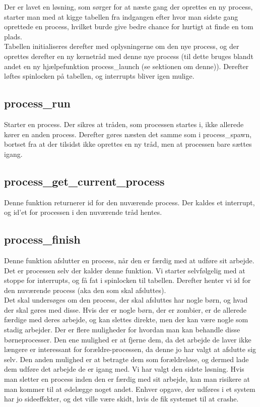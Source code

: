\documentclass[10pt,a4paper,danish]{article}
\begin{document}
Der er lavet en løsning, som sørger for at næste gang der oprettes en ny process, starter man med at kigge tabellen fra indgangen efter hvor man sidste gang oprettede en process, hvilket burde give bedre chance for hurtigt at finde en tom plads.\\

Tabellen initialiseres derefter med oplysningerne om den nye process, og der oprettes derefter en ny kernetråd med denne nye process (til dette bruges blandt andet en ny hjælpefunktion process\_launch (se sektionen om denne)). Derefter løftes spinlocken på tabellen, og interrupts bliver igen mulige. 

\subsection{process\_run}
Starter en process. Der sikres at tråden, som processen startes i, ikke allerede kører en anden process. Derefter gøres næsten det samme som i process\_spawn, bortset fra at der tilsidst ikke oprettes en ny tråd, men at processen bare sættes igang.

\subsection{process\_get\_current\_process}
Denne funktion returnerer id for den nuværende process. Der kaldes et interrupt, og id'et for processen i den nuværende tråd hentes.

\subsection{process\_finish}
Denne funktion afslutter en process, når den er færdig med at udføre sit arbejde. Det er processen selv der kalder denne funktion. Vi starter selvfølgelig med at stoppe for interrupts, og få fat i spinlocken til tabellen. Derefter henter vi id for den nuværende process (aka den som skal afsluttes).\\

Det skal undersøges om den process, der skal afsluttes har nogle børn, og hvad der skal gøres med disse. Hvis der er nogle børn, der er zombier, er de allerede færdige med deres arbejde, og kan slettes direkte, men der kan være nogle som stadig arbejder. Der er flere muligheder for hvordan man kan behandle disse børneprocesser. Den ene mulighed er at fjerne dem, da det arbejde de laver ikke længere er interessant for forældre-processen, da denne jo har valgt at afslutte sig selv. Den anden mulighed er at betragte dem som forældreløse, og dermed lade dem udføre det arbejde de er igang med. Vi har valgt den sidste løsning. Hvis man sletter en process inden den er færdig med sit arbejde, kan man risikere at man kommer til at ødelægge noget andet. Enhver opgave, der udføres i et system har jo sideeffekter, og det ville være skidt, hvis de fik systemet til at crashe.\\
\end{document}
